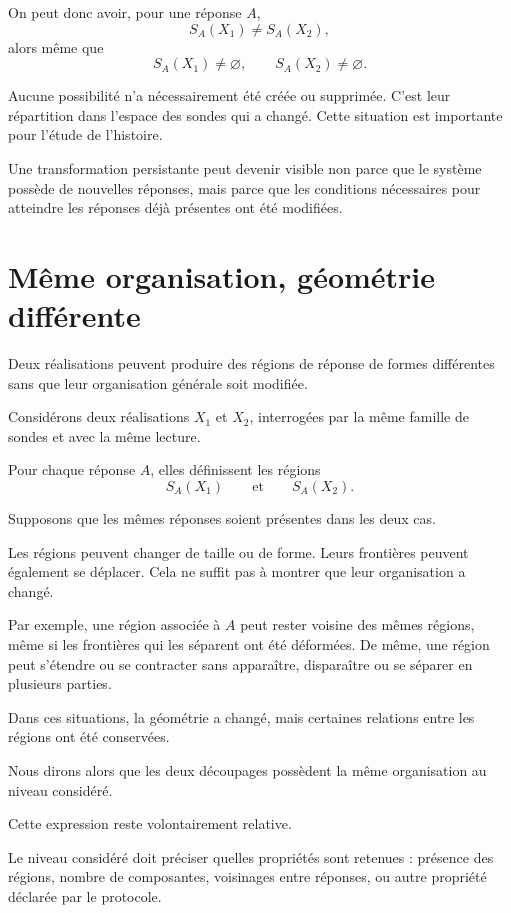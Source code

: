 On peut donc avoir, pour une réponse $A$,
\[
S_A(X_1)\neq S_A(X_2),
\]
alors même que
\[
S_A(X_1)\neq\varnothing,
\qquad
S_A(X_2)\neq\varnothing.
\]

Aucune possibilité n'a nécessairement été créée ou supprimée. C'est leur répartition dans l'espace des sondes qui a changé. Cette situation est importante pour l'étude de l'histoire.

Une transformation persistante peut devenir visible non parce que le
système possède de nouvelles réponses, mais parce que les conditions
nécessaires pour atteindre les réponses déjà présentes ont été
modifiées.

\section{Même organisation, géométrie différente}
\label{t3-meme-organisation-geometrie-differente}

Deux réalisations peuvent produire des régions de réponse de formes différentes sans que leur organisation générale soit modifiée.

Considérons deux réalisations $X_1$ et $X_2$, interrogées par la même famille de sondes et avec la même lecture.

Pour chaque réponse $A$, elles définissent les régions
\[
S_A(X_1)
\qquad\text{et}\qquad
S_A(X_2).
\]

Supposons que les mêmes réponses soient présentes dans les deux cas.

Les régions peuvent changer de taille ou de forme. Leurs frontières peuvent également se déplacer. Cela ne suffit pas à montrer que leur organisation a changé.

Par exemple, une région associée à $A$ peut rester voisine des mêmes régions, même si les frontières qui les séparent ont été déformées. De même, une région peut s'étendre ou se contracter sans apparaître, disparaître ou se séparer en plusieurs parties.

Dans ces situations, la géométrie a changé, mais certaines relations
entre les régions ont été conservées.

Nous dirons alors que les deux découpages possèdent la même organisation au niveau considéré.

Cette expression reste volontairement relative.

Le niveau considéré doit préciser quelles propriétés sont retenues : présence des régions, nombre de composantes, voisinages entre réponses, ou autre propriété déclarée par le protocole.

